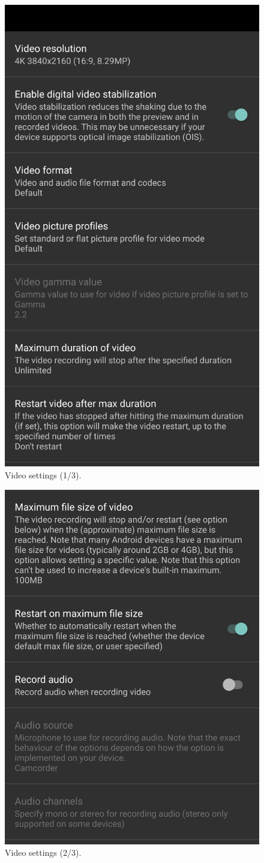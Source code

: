 \documentclass[12pt,letterpaper,english,bibliography=totocnumbered, abstract=on]{scrartcl}
\begin{document}
\begin{figure}[H]
\centering
\includegraphics[width=0.7\linewidth]{images/videosettings1}
\caption{Video settings (1/3).}
\label{fig:videosettings1}
\end{figure}

\begin{figure}[H]
	\centering
	\includegraphics[width=0.7\linewidth]{images/videosettings2}
	\caption{Video settings (2/3).}
	\label{fig:videosettings2}
\end{figure}
\end{document}
